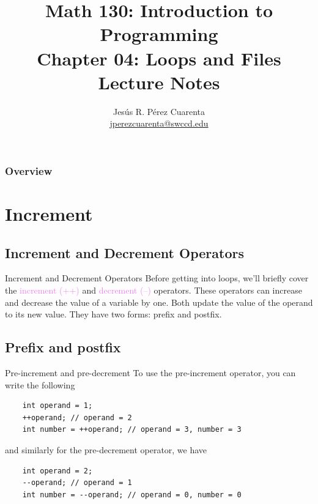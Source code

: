 \documentclass[11pt]{beamer}
\title[Chapter 04 Notes]{Math 130: Introduction to Programming \\ Chapter 04: Loops and Files \\ Lecture Notes}
\author{Jesús R. Pérez Cuarenta \\
	\href{mailto:jperezcuarenta@swccd.edu}{jperezcuarenta@swccd.edu}
	}
\date{}
\newcommand{\violet}[1]{\textcolor{violet}{#1}}
\begin{document}
\section{}
\begin{frame}
  \maketitle
\end{frame}

\begin{frame}
\frametitle{Overview}
    \begin{multicols}{2}
    \tableofcontents
    \end{multicols}
\end{frame}

\section{Increment}
\subsection{Increment and Decrement Operators}
\begin{frame}{Increment and Decrement Operators}
    Before getting into loops, we'll briefly cover the \violet{increment (++)} and \violet{decrement (--)} operators. These operators can increase and decrease the value of a variable by one. Both update the value of the operand to its new value. They have two forms: prefix and postfix.
\end{frame}

\subsection{Prefix and postfix}
\begin{frame}[fragile]{Pre-increment and pre-decrement}
    To use the pre-increment operator, you can write the following
    \begin{lstlisting}
    int operand = 1;
    ++operand; // operand = 2
    int number = ++operand; // operand = 3, number = 3
    \end{lstlisting}
    and similarly for the pre-decrement operator, we have
    \begin{lstlisting}
    int operand = 2;
    --operand; // operand = 1
    int number = --operand; // operand = 0, number = 0
    \end{lstlisting}    
\end{frame}
\end{document}
